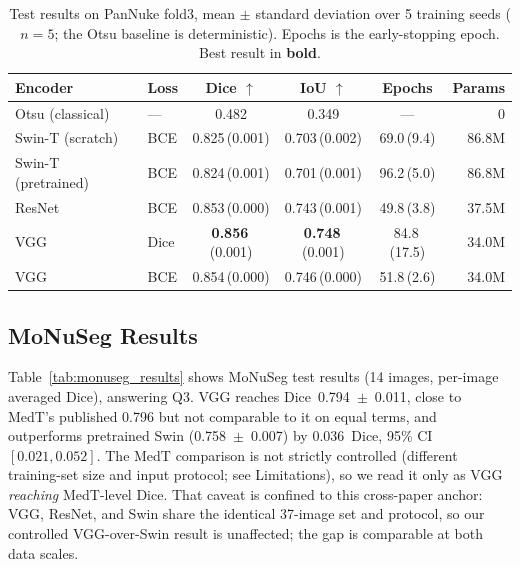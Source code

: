 \documentclass[runningheads]{llncs}
\begin{document}
\begin{table}[t]
\centering
\caption{Test results on PanNuke fold3, mean $\pm$ standard deviation over 5
training seeds ($n{=}5$; the Otsu baseline is deterministic). Epochs is the
early-stopping epoch. Best result in \textbf{bold}.}
\label{tab:pannuke_results}
\begin{tabular}{@{}llcccr@{}}
\toprule
\textbf{Encoder} & \textbf{Loss} & \textbf{Dice} $\uparrow$ & \textbf{IoU} $\uparrow$ & \textbf{Epochs} & \textbf{Params} \\
\midrule
Otsu (classical) & --- & 0.482 & 0.349 & --- & 0 \\
\midrule
Swin-T (scratch) & BCE & 0.825\,(0.001) & 0.703\,(0.002) & 69.0\,(9.4) & 86.8M \\
Swin-T (pretrained) & BCE & 0.824\,(0.001) & 0.701\,(0.001) & 96.2\,(5.0) & 86.8M \\
ResNet & BCE & 0.853\,(0.000) & 0.743\,(0.001) & 49.8\,(3.8) & 37.5M \\
VGG & Dice & \textbf{0.856}\,(0.001) & \textbf{0.748}\,(0.001) & 84.8\,(17.5) & 34.0M \\
VGG & BCE & 0.854\,(0.000) & 0.746\,(0.000) & 51.8\,(2.6) & 34.0M \\
\bottomrule
\end{tabular}
\end{table}

\subsection{MoNuSeg Results}
\label{sec:monuseg_results}

Table~\ref{tab:monuseg_results} shows MoNuSeg test results (14 images, per-image averaged Dice), answering Q3. VGG reaches Dice~0.794~$\pm$~0.011, close to MedT's published 0.796 but
not comparable to it on equal terms, and outperforms pretrained Swin
(0.758~$\pm$~0.007) by 0.036~Dice, 95\% CI $[0.021, 0.052]$. The MedT comparison is not strictly controlled (different training-set size and input protocol; see Limitations), so we read it only as VGG \emph{reaching} MedT-level Dice. That caveat is confined to this cross-paper anchor: VGG, ResNet, and Swin share the identical 37-image set and protocol, so our controlled VGG-over-Swin result is unaffected;
the gap is comparable at both data scales.
\end{document}

